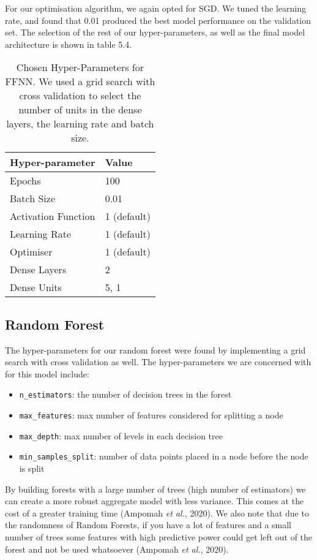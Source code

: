 For our optimisation algorithm, we again opted for SGD. We tuned the learning rate, and found that 0.01 produced the best model performance on the validation set. The selection of the rest of our hyper-parameters, as well as the final model architecture is shown in table 5.4. 



\begin{table}[h]
\centering
\begin{tabular}{ll}
\hline
Hyper-parameter     &  Value \\
\hline
Epochs       & 100  \\
Batch Size      & 0.01 \\
Activation Function & 1 (default) \\
Learning Rate & 1 (default) \\
Optimiser & 1 (default) \\
Dense Layers & 2\\
Dense Units & 5, 1\\
\hline
\end{tabular}
\caption{Chosen Hyper-Parameters for FFNN. We used a grid search with cross validation to select the number of units in the dense layers, the learning rate and batch size.}
\end{table}


\subsection{Random Forest}

The hyper-parameters for our random forest were found by implementing a grid search with cross validation as well. The hyper-parameters we are concerned with for this model include:
\begin{itemize}
\item \verb|n_estimators|: the number of decision trees in the forest
\item  \verb|max_features|: max number of features considered for splitting a node
\item  \verb|max_depth|: max number of levels in each decision tree
\item  \verb|min_samples_split|:  number of data points placed in a node before the node is split
\end{itemize}

By building forests with a large number of trees (high number of estimators) we can create a more robust aggregate model with less variance. This comes at the cost of a greater training time (Ampomah \textit{et al.}, 2020). We also note that due to the randomness of Random Forests, if you have a lot of features and a small number of trees some features with high predictive power could get left out of the forest and not be used whatsoever (Ampomah \textit{et al.}, 2020). 

